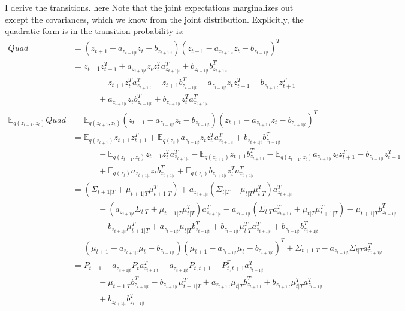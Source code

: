\documentclass[11pt, reqno]{article}
\numberwithin{equation}{section}
\begin{document}
I derive the transitions. here  Note that the joint expectations marginalizes out except the covariances, which we know from the joint distribution.  Explicitly, the quadratic form is in the transition probability is: 
\begin{align*}
Quad &= (z_{t+1} - a_{z_{t+1|t}}z_t -b_{z_{t+1|t}})(z_{t+1} - a_{z_{t+1|t}}z_t -b_{z_{t+1|t}})^T \\
&= z_{t+1}z_{t+1}^T + a_{z_{t+1|t}}z_tz_t^Ta_{z_{t+1|t}}^T + b_{z_{t+1|t}}b_{z_{t+1|t}}^T \\ 
&\hspace{3em} - z_{t+1}z_{t}^T a_{z_{t+1|t}}^T - z_{t+1}b_{z_{t+1|t}}^T - a_{z_{t+1|t}}z_{t}z_{t+1}^T - b_{z_{t+1|t}}z_{t+1}^T\\
&\hspace{3em} + a_{z_{t+1|t}}z_{t}b_{z_{t+1|t}}^T  + b_{z_{t+1|t}}z_{t}^T a_{z_{t+1|t}}^T  \\
\mathbb{E}_{q(z_{t+1}, z_t)} Quad
&= \mathbb{E}_{q(z_{t+1}, z_t)} (z_{t+1} - a_{z_{t+1|t}}z_t -b_{z_{t+1|t}})(z_{t+1} - a_{z_{t+1|t}}z_t -b_{z_{t+1|t}})^T \\
&= \mathbb{E}_{q(z_{t+1})}z_{t+1}z_{t+1}^T + \mathbb{E}_{q(z_{t})}a_{z_{t+1|t}}z_tz_t^Ta_{z_{t+1|t}}^T + b_{z_{t+1|t}}b_{z_{t+1|t}}^T \\ 
&\hspace{3em} -  \mathbb{E}_{q(z_{t+1},z_t)} z_{t+1}z_{t}^T a_{z_{t+1|t}}^T - \mathbb{E}_{q(z_{t+1})}z_{t+1}b_{z_{t+1|t}}^T - \mathbb{E}_{q(z_{t+1},z_t)}a_{z_{t+1|t}}z_{t}z_{t+1}^T - b_{z_{t+1|t}}z_{t+1}^T\\
&\hspace{3em} + \mathbb{E}_{q(z_t)} a_{z_{t+1|t}}z_{t}b_{z_{t+1|t}}^T  + \mathbb{E}_{q(z_t)} b_{z_{t+1|t}}z_{t}^T a_{z_{t+1|t}}^T  \\
&= (\Sigma_{t+1|T}+\mu_{t+1|T}\mu_{t+1|T}^T) + a_{z_{t+1|t}}(\Sigma_{t|T} + \mu_{t|T}\mu_{t|T}^T)a_{z_{t+1|t}}^T \\ 
&\hspace{3em} - (a_{z_{t+1|t}}\Sigma_{t|T} + \mu_{t+1|T}\mu_{t|T}^T)a_{z_{t+1|t}}^T - a_{z_{t+1|t}}(\Sigma_{t|T}a_{z_{t+1|t}}^T + \mu_{t|T}\mu_{t+1|T}^T) - \mu_{t+1|T}b_{z_{t+1|t}}^T \\
&\hspace{3em} - b_{z_{t+1|t}}\mu_{t+1|T}^T + a_{z_{t+1|t}}\mu_{t|T}b_{z_{t+1|t}}^T  + b_{z_{t+1|t}}\mu_{t|T}^T a_{z_{t+1|t}}^T  + b_{z_{t+1|t}}b_{z_{t+1|t}}^T \\
&= (\mu_{t+1} - a_{z_{t+1|t}}\mu_t - b_{z_{t+1|t}})(\mu_{t+1} - a_{z_{t+1|t}}\mu_t - b_{z_{t+1|t}})^T + \Sigma_{t+1|T} - a_{z_{t+1|t}}\Sigma_{t|T}a_{z_{t+1|t}}^T \\ 
&= P_{t+1} + a_{z_{t+1|t}}P_{t}a_{z_{t+1|t}}^T  - a_{z_{t+1|t}}P_{t,t+1} - P_{t,t+1}^T a_{z_{t+1|t}}^T \\
&\hspace{3em} - \mu_{t+1|T}b_{z_{t+1|t}}^T - b_{z_{t+1|t}}\mu_{t+1|T}^T  + a_{z_{t+1|t}}\mu_{t|T}b_{z_{t+1|t}}^T  + b_{z_{t+1|t}}\mu_{t|T}^T a_{z_{t+1|t}}^T  \\
&\hspace{3em} + b_{z_{t+1|t}}b_{z_{t+1|t}}^T \\
\end{align*}
\end{document}
